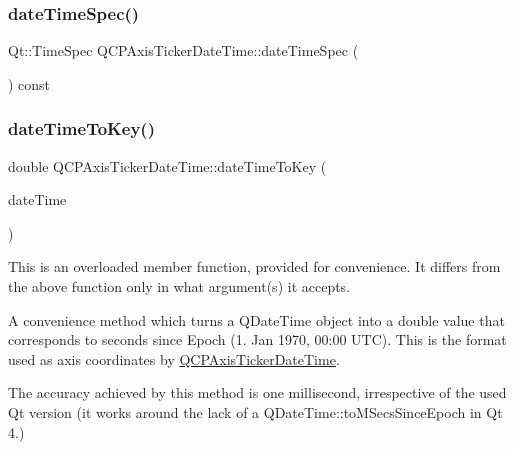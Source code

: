 \mbox{\label{class_q_c_p_axis_ticker_date_time_ae688e69ba55c9247af26b6db85cf9573}} 
\subsubsection{\texorpdfstring{dateTimeSpec()}{dateTimeSpec()}}
{\footnotesize\ttfamily Qt\+::\+Time\+Spec Q\+C\+P\+Axis\+Ticker\+Date\+Time\+::date\+Time\+Spec (\begin{DoxyParamCaption}{ }\end{DoxyParamCaption}) const\hspace{0.3cm}{\ttfamily [inline]}}

\mbox{\label{class_q_c_p_axis_ticker_date_time_aa24f293f16fff0f937bf71f4140033f1}} 
\subsubsection{\texorpdfstring{dateTimeToKey()}{dateTimeToKey()}\hspace{0.1cm}{\footnotesize\ttfamily [1/2]}}
{\footnotesize\ttfamily double Q\+C\+P\+Axis\+Ticker\+Date\+Time\+::date\+Time\+To\+Key (\begin{DoxyParamCaption}\item[{const Q\+Date\+Time}]{date\+Time }\end{DoxyParamCaption})\hspace{0.3cm}{\ttfamily [static]}}

This is an overloaded member function, provided for convenience. It differs from the above function only in what argument(s) it accepts.

A convenience method which turns a Q\+Date\+Time object into a double value that corresponds to seconds since Epoch (1. Jan 1970, 00\+:00 U\+TC). This is the format used as axis coordinates by \mbox{\hyperlink{class_q_c_p_axis_ticker_date_time}{Q\+C\+P\+Axis\+Ticker\+Date\+Time}}.

The accuracy achieved by this method is one millisecond, irrespective of the used Qt version (it works around the lack of a Q\+Date\+Time\+::to\+M\+Secs\+Since\+Epoch in Qt 4.)

